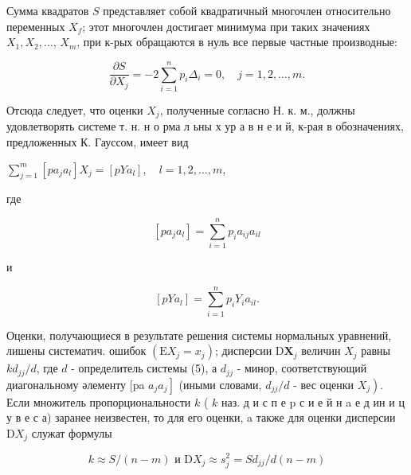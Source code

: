 \documentclass[10pt]{article}
\begin{document}
Сумма квадратов $S$ представляет собой квадратичный многочлен относительно переменных $X_{f}$; этот многочлен достигает минимума при таких значениях $X_{1}, X_{2}, \ldots$, $X_{m}$, при к-рых обращаются в нуль все первые частные производные:



\[

\frac{\partial S}{\partial X_{j}}=-2 \sum_{i=1}^{n} p_{i} \Delta_{i}=0, \quad j=1,2, \ldots, m .

\]



Отсюда следует, что оценки $X_{j}$, полученные согласно Н. к. м., должны удовлетворять системе т. н. н о рма л ьны х ур а в н е и й, к-рая в обозначениях, предложенных К. Гауссом, имеет вид



$\sum_{j=1}^{m}\left[p a_{j} a_{l}\right] X_{j}=\left[p Y a_{l}\right], \quad l=1,2, \ldots, m$,



где



\[

\left[p a_{j} a_{l}\right]=\sum_{i=1}^{n} p_{i} a_{i j} a_{i l}

\]



и



\[

\left[p Y a_{l}\right]=\sum_{i=1}^{n} p_{i} Y_{i} a_{i l} .

\]



Оценки, получающиеся в результате решения системы нормальных уравнений, лишены систематич. ошибок $\left(\mathrm{E} X_{j}=x_{j}\right)$; дисперсии $\mathrm{D} \boldsymbol{X}_{j}$ величин $X_{j}$ равны $k d_{j j} / d$, где $d$ - определитель системы (5), а $d_{j j}$ - минор, соответствующий диагональному әлементу [pa $\left.a_{j} a_{j}\right]$ (иными словами, $d_{j j} / d$ - вес оценки $\left.X_{j}\right)$. Если множитель пропорциональности $k$ ( $k$ наз. д и с п е p с и е й н a е д ин и ц у в е с а) заранее неизвестен, то для его оценки, a также для оценки дисперсии $\mathrm{D} X_{j}$ служат формулы



\[

k \approx S /(n-m) \text { и } \mathrm{D} X_{j} \approx s_{j}^{2}=S d_{j j} / d(n-m)

\]
\end{document}
